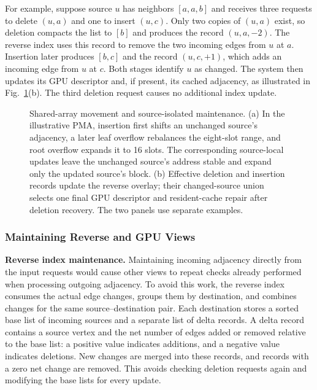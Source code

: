 For example, suppose source $u$ has neighbors $[a,a,b]$ and receives three requests to delete $(u,a)$ and one to insert $(u,c)$. Only two copies of $(u,a)$ exist, so deletion compacts the list to $[b]$ and produces the record $(u,a,-2)$. The reverse index uses this record to remove the two incoming edges from $u$ at $a$. Insertion later produces $[b,c]$ and the record $(u,c,+1)$, which adds an incoming edge from $u$ at $c$. Both stages identify $u$ as changed. The system then updates its GPU descriptor and, if present, its cached adjacency, as illustrated in Fig.~\ref{fig:2}(b). The third deletion request causes no additional index update.


\begin{figure}[t]
\centering
{}
\caption{Shared-array movement and source-isolated maintenance. (a) In the illustrative PMA, insertion first shifts an unchanged source's adjacency, a later leaf overflow rebalances the eight-slot range, and root overflow expands it to 16 slots. The corresponding source-local updates leave the unchanged source's address stable and expand only the updated source's block. (b) Effective deletion and insertion records update the reverse overlay; their changed-source union selects one final GPU descriptor and resident-cache repair after deletion recovery. The two panels use separate examples.}
\label{fig:2}
\end{figure}


\subsubsection{Maintaining Reverse and GPU Views}
\label{sec:view-maintenance}


\textbf{Reverse index maintenance.} Maintaining incoming adjacency directly from the input requests would cause other views to repeat checks already performed when processing outgoing adjacency. To avoid this work, the reverse index consumes the actual edge changes, groups them by destination, and combines changes for the same source--destination pair. Each destination stores a sorted base list of incoming sources and a separate list of delta records. A delta record contains a source vertex and the net number of edges added or removed relative to the base list: a positive value indicates additions, and a negative value indicates deletions. New changes are merged into these records, and records with a zero net change are removed. This avoids checking deletion requests again and modifying the base lists for every update.

